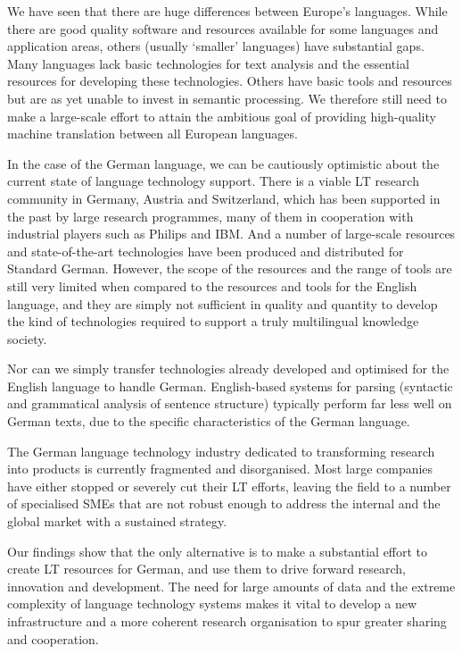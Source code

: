 \documentclass[]{../../metanetpaper}
\begin{document}
\begin{Parallel}[c]{79mm}{78mm}
{    We have seen that there are huge differences between Europe’s languages. While there are good quality software and resources available for some languages and application areas, others (usually ‘smaller’ languages) have substantial gaps. Many languages lack basic technologies for text analysis and the essential resources for developing these technologies. Others have basic tools and resources but are as yet unable to invest in semantic processing. We therefore still need to make a large-scale effort to attain the ambitious goal of providing high-quality machine translation between all European languages. 

    In the case of the German language, we can be cautiously optimistic about the current state of language technology support. There is a viable LT research community in Germany, Austria and Switzerland, which has been supported in the past by large research programmes, many of them in cooperation with industrial players such as Philips and IBM. And a number of large-scale resources and state-of-the-art technologies have been produced and distributed for Standard German. However, the scope of the resources and the range of tools are still very limited when compared to the resources and tools for the English language, and they are simply not sufficient in quality and quantity to develop the kind of technologies required to support a truly multilingual knowledge society.

    Nor can we simply transfer technologies already developed and optimised for the English language to handle German. English-based systems for parsing (syntactic and grammatical analysis of sentence structure) typically perform far less well on German texts, due to the specific characteristics of the German language.

    The German language technology industry dedicated to transforming research into products is currently fragmented and disorganised. Most large companies have either stopped or severely cut their LT efforts, leaving the field to a number of specialised SMEs that are not robust enough to address the internal and the global market with a sustained strategy. 

    Our findings show that the only alternative is to make a substantial effort to create LT resources for German, and use them to drive forward research, innovation and development. The need for large amounts of data and the extreme complexity of language technology systems makes it vital to develop a new infrastructure and a more coherent research organisation to spur greater sharing and cooperation.

}
\end{Parallel}
\end{document}
